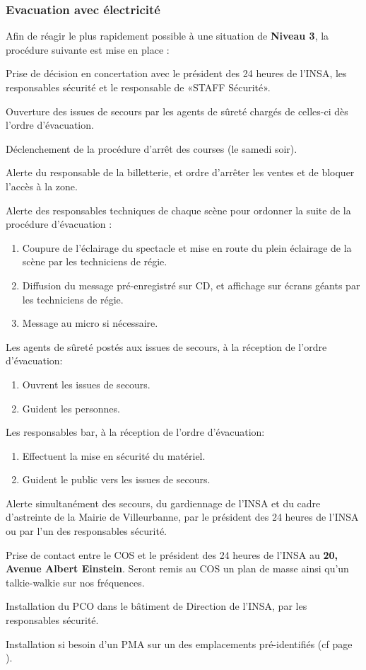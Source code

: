 \documentclass[hidelinks, paper=a4, fontsize=13pt]{report}
\begin{document}
\subsubsection{Evacuation avec électricité}
Afin de réagir le plus rapidement possible à une situation de \textbf{Niveau 3}, la procédure suivante est mise en place :
\begin{list}{•}{}
	\item Prise de décision en concertation avec le président des 24 heures de l'INSA, les responsables sécurité et le responsable de «STAFF Sécurité».
	\item Ouverture des issues de secours par les agents de sûreté chargés de celles-ci dès l’ordre d’évacuation.
	\item Déclenchement de la procédure d’arrêt des courses (le samedi soir).
	\item Alerte du responsable de la billetterie, et ordre d'arrêter les ventes et de bloquer l’accès à la zone. 
	\item Alerte des responsables techniques de chaque scène pour ordonner la suite de la procédure d’évacuation :
	\begin{enumerate}
		\item Coupure de l’éclairage du spectacle et mise en route du plein éclairage de la scène par les techniciens de régie. 
		\item Diffusion du message pré-enregistré sur CD, et affichage sur écrans géants par les techniciens de régie.
		\item Message au micro si nécessaire.
	\end{enumerate}
	\item Les agents de sûreté postés aux issues de secours, à la réception de l’ordre d’évacuation:
	\begin{enumerate}
		\item Ouvrent les issues de secours.
		\item Guident les personnes.
	\end{enumerate}
	\item Les responsables bar, à la réception de l’ordre d’évacuation:
	\begin{enumerate}
		\item Effectuent la mise en sécurité du matériel.
		\item Guident le public vers les issues de secours.
	\end{enumerate}
	\item Alerte simultanément des secours, du gardiennage de l’INSA et du cadre d’astreinte de la Mairie de Villeurbanne, par le président des 24 heures de l'INSA ou par l'un des responsables sécurité.
	\item Prise de contact entre le COS et le président des 24 heures de l'INSA au \textbf{20, Avenue Albert Einstein}. Seront remis au COS un plan de masse ainsi qu’un talkie-walkie sur nos fréquences.
	\item Installation du PCO dans le bâtiment de Direction de l'INSA, par les responsables sécurité.
	\item Installation si besoin d’un PMA sur un des emplacements pré-identifiés (cf page \pageref{refEmplacementPMA}).
\end{list}
\end{document}
